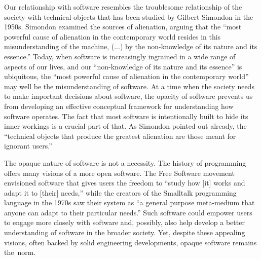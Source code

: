 Our relationship with software resembles the troublesome relationship of the
society with technical objects that has been studied by Gilbert Simondon in the
1950s. Simondon examined the sources of alienation,
arguing that the ``most powerful cause of alienation in the contemporary world
resides in this misunderstanding of the machine, (...) by the non-knowledge of its
nature and its essence.''
Today, when software is increasingly ingrained in a wide range of aspects of our lives,
and our ``non-knowledge of its nature and its essence'' is ubiquitous,
the ``most powerful cause of alienation in the contemporary world'' may well be the
misunderstanding of software. At a time when the society needs to make important decisions
about software, the opacity of software prevents us from developing an effective conceptual framework for
understanding how software operates. The fact that most software is intentionally built to hide
its inner workings is a crucial part of that. As Simondon pointed out already, the ``technical
objects that produce the greatest alienation are those meant for ignorant
users.''

The opaque nature of software is not a necessity. The history of programming offers
many visions of a more open software. The Free Software movement envisioned software
that gives users the freedom to ``study how [it] works and adapt it to [their]
needs,''
while the creators of the Smalltalk programming language in the 1970s saw their system as
``a general purpose meta-medium that anyone can adapt to their particular
needs.'' Such software could empower users
to engage more closely with software and, possibly, also help develop a better understanding
of software in the broader society. Yet, despite these appealing visions, often backed by
solid engineering developments, opaque software remains the~norm.


